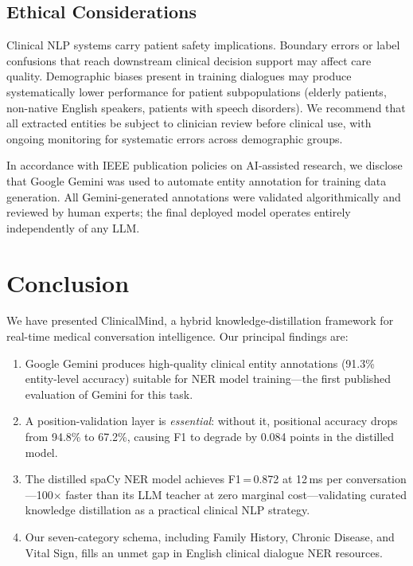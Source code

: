 \documentclass[conference]{IEEEtran}
\begin{document}
\subsection{Ethical Considerations}

Clinical NLP systems carry patient safety implications. Boundary errors or
label confusions that reach downstream clinical decision support may affect
care quality. Demographic biases present in training dialogues may produce
systematically lower performance for patient subpopulations (elderly patients,
non-native English speakers, patients with speech disorders). We recommend
that all extracted entities be subject to clinician review before clinical
use, with ongoing monitoring for systematic errors across demographic groups.

In accordance with IEEE publication policies on AI-assisted research, we
disclose that Google Gemini was used to automate entity annotation for
training data generation. All Gemini-generated annotations were validated
algorithmically and reviewed by human experts; the final deployed model
operates entirely independently of any LLM.

\section{Conclusion}
\label{sec:conclusion}

We have presented ClinicalMind, a hybrid knowledge-distillation framework
for real-time medical conversation intelligence. Our principal findings are:

\begin{enumerate}
  \item Google Gemini produces high-quality clinical entity annotations
  (91.3\% entity-level accuracy) suitable for NER model training—the first
  published evaluation of Gemini for this task.
  \item A position-validation layer is \emph{essential}: without it,
  positional accuracy drops from 94.8\% to 67.2\%, causing F1 to degrade
  by 0.084 points in the distilled model.
  \item The distilled spaCy NER model achieves F1\,=\,0.872 at 12\,ms per
  conversation—100$\times$ faster than its LLM teacher at zero marginal
  cost—validating curated knowledge distillation as a practical clinical
  NLP strategy.
  \item Our seven-category schema, including Family History, Chronic Disease,
  and Vital Sign, fills an unmet gap in English clinical dialogue NER resources.
\end{enumerate}
\end{document}
